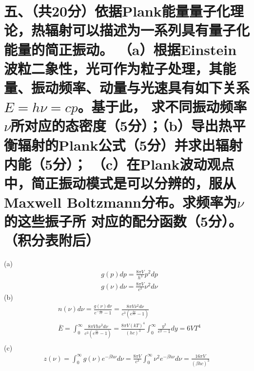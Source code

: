\documentclass[UTF8]{ctexart}
\begin{document}
\section*{五、（共20分）依据Plank能量量子化理论，热辐射可以描述为一系列具有量子化能量的简正振动。
  （a）根据Einstein波粒二象性，光可作为粒子处理，其能量、振动频率、动量与光速具有如下关系$E=h\nu=cp$。基于此，
  求不同振动频率$\nu$所对应的态密度（5分）；（b）导出热平衡辐射的Plank公式（5分）并求出辐射内能（5分）；
  （c）在Plank波动观点中，简正振动模式是可以分辨的，服从Maxwell Boltzmann分布。求频率为$\nu$的这些振子所
  对应的配分函数（5分）。（积分表附后）}
 (a)
\begin{equation*}
  \begin{aligned}
     & g(p)dp=\frac{8\pi V}{h^3}p^2dp         \\
     & g(\nu)d\nu=\frac{8\pi V}{c^3}\nu^2d\nu
  \end{aligned}
\end{equation*}
(b)
\begin{equation*}
  \begin{aligned}
     & n(\nu)d\nu=\frac{g(\nu)d\nu}{e^{-\frac{\varepsilon}{kT}}-1}
    =\frac{8\pi V\nu^2d\nu}{c^3(e^{\frac{h\nu}{kT}}-1)}                              \\
     & \overline{E}=\int_0^\infty\frac{8\pi Vh\nu^3d\nu}{c^3(e^{\frac{h\nu}{kT}}-1)}
    =\frac{8\pi V(kT)^4}{(hc)^3}\int_0^\infty\frac{y^3}{e^y-1}dy=6VT^4               \\
  \end{aligned}
\end{equation*}
(c)
\begin{equation*}
  \begin{aligned}
    z(\nu)=\int_0^\infty g(\nu)e^{-\beta h\nu}d\nu
    =\frac{8\pi V}{c^3}\int_0^\infty\nu^2e^{-\beta h\nu}d\nu
    =\frac{16\pi V}{(\beta hc)^3}
  \end{aligned}
\end{equation*}
\end{document}
